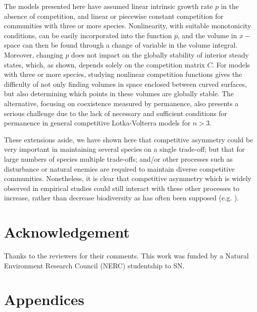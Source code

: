 The models presented here have assumed linear intrinsic growth rate $p$ in the absence of competition, and linear or piecewise constant competition for communities with three or more species. Nonlinearity, with suitable monotonicity conditions, can be easily incorporated into the function $p$, and the volume in $x-$space can then be found through a change of variable in the volume integral. Moreover, changing $p$ does not impact on the globally stability of interior steady states, which, as shown, depends solely on the competition matrix $C$. For models with three or more species, studying nonlinear competition functions gives the difficulty of not only finding volumes in space enclosed between curved surfaces, but also determining which points in these volumes are globally stable. The alternative, focusing on coexistence measured by permanence, also presents a serious challenge due to the lack of necessary and sufficient conditions for permanence in general competitive Lotka-Volterra models for $n>3$.

These extensions aside, we have shown here that competitive asymmetry could be very important in maintaining several species on a single trade-off; but that for large numbers of species multiple trade-offs; and/or other processes such as disturbance or natural enemies are required to maintain diverse competitive communities. Nonetheless, it is clear that competitive asymmetry which is widely observed in empirical studies could still interact with these other processes to increase, rather than decrease biodiversity as has often been supposed (e.g. \cite{keddy1997experimental, resetarits1995competitive}).

\section*{Acknowledgement}

Thanks to the reviewers for their comments. This work was funded by a Natural Environment Research Council (NERC) studentship to SN.

\section*{Appendices}
\bappendix
